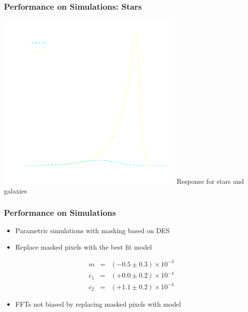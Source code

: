 \documentclass{beamer}
\begin{document}
\frame
{
    \frametitle{Performance on Simulations: Stars}
 
    \begin{center}
        \includegraphics[width=0.7\textwidth]{R-dt-with-stars-icolor.pdf}
        \newline
        {\large Response for stars and galaxies}
    \end{center}

}



\frame
{
    \frametitle{Performance on Simulations}

 
    \begin{itemize}
            

        \item Parametric simulations with {\color{brightred} masking based on DES}
         \item Replace masked pixels with the best fit model

             {\color{lightsteelblue} 
                 \begin{eqnarray}
                     m & = & (-0.5 \pm 0.3) \times 10^{-3} \nonumber \\
                   c_1 & = & (+0.0 \pm 0.2) \times 10^{-4} \nonumber \\
                   c_2 & = & (+1.1 \pm 0.2) \times 10^{-4} \nonumber
                 \end{eqnarray}
             }

         \item FFTs not biased by replacing masked pixels with model

    \end{itemize}

}
\end{document}
